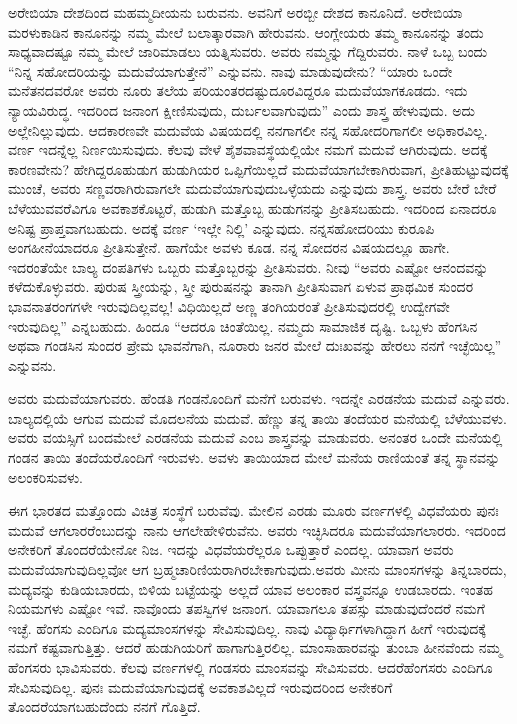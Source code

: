 ಅರೇಬಿಯಾ ದೇಶದಿಂದ ಮಹಮ್ಮದೀಯನು ಬರುವನು. ಅವನಿಗೆ ಅರಬ್ಬೀ ದೇಶದ ಕಾನೂನಿದೆ. ಅರೇಬಿಯಾ ಮರಳುಕಾಡಿನ ಕಾನೂನನ್ನು ನಮ್ಮ ಮೇಲೆ ಬಲಾತ್ಕಾರವಾಗಿ ಹೇರುವನು. ಆಂಗ್ಲೇಯರು ತಮ್ಮ ಕಾನೂನನ್ನು ತಂದು ಸಾಧ್ಯವಾದಷ್ಟೂ ನಮ್ಮ ಮೇಲೆ ಜಾರಿಮಾಡಲು ಯತ್ನಿಸುವರು. ಅವರು ನಮ್ಮನ್ನು ಗೆದ್ದಿರುವರು. ನಾಳೆ ಒಬ್ಬ ಬಂದು “ನಿನ್ನ ಸಹೋದರಿಯನ್ನು ಮದುವೆಯಾಗುತ್ತೇನೆ” ಎನ್ನುವನು. ನಾವು ಮಾಡುವುದೇನು? “ಯಾರು ಒಂದೇ ಮನೆತನದವರೋ ಅವರು ನೂರು ತಲೆಯ ಪರಿಯಂತರದಷ್ಟು\break ದೂರವಿದ್ದರೂ ಮದುವೆಯಾಗಕೂಡದು. ಇದು ನ್ಯಾಯವಿರುದ್ಧ. ಇದರಿಂದ ಜನಾಂಗ ಕ್ಷೀಣಿಸುವುದು, ದುರ್ಬಲವಾಗುವುದು” ಎಂದು ಶಾಸ್ತ್ರ ಹೇಳುವುದು. ಅದು ಅಲ್ಲೇ\break ನಿಲ್ಲುವುದು. ಆದಕಾರಣವೇ ಮದುವೆಯ ವಿಷಯದಲ್ಲಿ ನನಗಾಗಲೀ ನನ್ನ ಸಹೋದರಿಗಾಗಲೀ ಅಧಿಕಾರವಿಲ್ಲ. ವರ್ಣ ಇದನ್ನೆಲ್ಲ ನಿರ್ಣಯಿಸುವುದು. ಕೆಲವು ವೇಳೆ ಶೈಶವಾವಸ್ಥೆಯಲ್ಲಿಯೇ ನಮಗೆ ಮದುವೆ ಆಗಿರುವುದು. ಅದಕ್ಕೆ ಕಾರಣವೇನು? ಹೇಗಿದ್ದರೂ\break ಹುಡುಗ ಹುಡುಗಿಯರ ಒಪ್ಪಿಗೆಯಿಲ್ಲದೆ ಮದುವೆಯಾಗಬೇಕಾಗಿರುವಾಗ, ಪ್ರೀತಿ\break ಹುಟ್ಟುವುದಕ್ಕೆ ಮುಂಚೆ, ಅವರು ಸಣ್ಣವರಾಗಿರುವಾಗಲೇ ಮದುವೆಯಾಗುವುದು\break ಒಳ್ಳೆಯದು ಎನ್ನುವುದು ಶಾಸ್ತ್ರ. ಅವರು ಬೇರೆ ಬೇರೆ ಬೆಳೆಯುವವರೆವಿಗೂ ಅವಕಾಶ\break ಕೊಟ್ಟರೆ, ಹುಡುಗಿ ಮತ್ತೊಬ್ಬ ಹುಡುಗನನ್ನು ಪ್ರೀತಿಸಬಹುದು. ಇದರಿಂದ ಏನಾದರೂ ಅನಿಷ್ಟ ಪ್ರಾಪ್ತವಾಗಬಹುದು. ಅದಕ್ಕೆ ವರ್ಣ ‘ಇಲ್ಲೇ ನಿಲ್ಲಿ’ ಎನ್ನುವುದು. ನನ್ನ\break ಸಹೋದರಿಯು ಕುರೂಪಿ ಅಂಗಹೀನೆಯಾದರೂ ಪ್ರೀತಿಸುತ್ತೇನೆ. ಹಾಗೆಯೇ ಅವಳು ಕೂಡ. ನನ್ನ ಸೋದರನ ವಿಷಯದಲ್ಲೂ ಹಾಗೇ. ಇದರಂತೆಯೇ ಬಾಲ್ಯ ದಂಪತಿಗಳು ಒಬ್ಬರು ಮತ್ತೊಬ್ಬರನ್ನು ಪ್ರೀತಿಸುವರು. ನೀವು “ಅವರು ಎಷ್ಟೋ ಆನಂದವನ್ನು ಕಳೆದುಕೊಳ್ಳುವರು. ಪುರುಷ ಸ್ತ್ರೀಯನ್ನು, ಸ್ತ್ರೀ ಪುರುಷನನ್ನು ತಾನಾಗಿ ಪ್ರೀತಿಸುವಾಗ ಏಳುವ ಪ್ರಾಥಮಿಕ ಸುಂದರ ಭಾವನಾತರಂಗಗಳೇ ಇರುವುದಿಲ್ಲವಲ್ಲ! ವಿಧಿಯಿಲ್ಲದೆ ಅಣ್ಣ ತಂಗಿಯರಂತೆ ಪ್ರೀತಿಸುವುದರಲ್ಲಿ ಉದ್ವೇಗವೇ ಇರುವುದಿಲ್ಲ” ಎನ್ನಬಹುದು. ಹಿಂದೂ “ಆದರೂ ಚಿಂತೆಯಿಲ್ಲ. ನಮ್ಮದು ಸಾಮಾಜಿಕ ದೃಷ್ಟಿ. ಒಬ್ಬಳು ಹೆಂಗಸಿನ ಅಥವಾ ಗಂಡಸಿನ ಸುಂದರ ಪ್ರೇಮ ಭಾವನೆಗಾಗಿ, ನೂರಾರು ಜನರ ಮೇಲೆ ದುಃಖವನ್ನು ಹೇರಲು ನನಗೆ ಇಚ್ಛೆಯಿಲ್ಲ” ಎನ್ನುವನು.

ಅವರು ಮದುವೆಯಾಗುವರು. ಹೆಂಡತಿ ಗಂಡನೊಂದಿಗೆ ಮನೆಗೆ ಬರುವಳು. ಇದನ್ನೇ ಎರಡನೆಯ ಮದುವೆ ಎನ್ನುವರು. ಬಾಲ್ಯದಲ್ಲಿಯೆ ಆಗುವ ಮದುವೆ ಮೊದಲನೆಯ ಮದುವೆ. ಹೆಣ್ಣು ತನ್ನ ತಾಯಿ ತಂದೆಯರ ಮನೆಯಲ್ಲಿ ಬೆಳೆಯುವಳು. ಅವರು ವಯಸ್ಸಿಗೆ ಬಂದಮೇಲೆ ಎರಡನೆಯ ಮದುವೆ ಎಂಬ ಶಾಸ್ತ್ರವನ್ನು ಮಾಡುವರು. ಅನಂತರ ಒಂದೇ ಮನೆಯಲ್ಲಿ ಗಂಡನ ತಾಯಿ ತಂದೆಯರೊಂದಿಗೆ ಇರುವಳು. ಅವಳು ತಾಯಿಯಾದ ಮೇಲೆ ಮನೆಯ ರಾಣಿಯಂತೆ ತನ್ನ ಸ್ಥಾನವನ್ನು ಅಲಂಕರಿಸುವಳು.

ಈಗ ಭಾರತದ ಮತ್ತೊಂದು ವಿಚಿತ್ರ ಸಂಸ್ಥೆಗೆ ಬರುವೆವು. ಮೇಲಿನ ಎರಡು ಮೂರು ವರ್ಣಗಳಲ್ಲಿ ವಿಧವೆಯರು ಪುನಃ ಮದುವೆ ಆಗಲಾರರೆಂಬುದನ್ನು ನಾನು ಆಗಲೇ\break ಹೇಳಿರುವೆನು. ಅವರು ಇಚ್ಛಿಸಿದರೂ ಮದುವೆಯಾಗಲಾರರು. ಇದರಿಂದ ಅನೇಕರಿಗೆ ತೊಂದರೆಯೇನೋ ನಿಜ. ಇದನ್ನು ವಿಧವೆಯರೆಲ್ಲರೂ ಒಪ್ಪುತ್ತಾರೆ ಎಂದಲ್ಲ. ಯಾವಾಗ ಅವರು ಮದುವೆಯಾಗುವುದಿಲ್ಲವೋ ಆಗ ಬ್ರಹ್ಮಚಾರಿಣಿಯರಾಗಿರಬೇಕಾಗುವುದು.\break ಅವರು ಮೀನು ಮಾಂಸಗಳನ್ನು ತಿನ್ನಬಾರದು, ಮದ್ಯವನ್ನು ಕುಡಿಯಬಾರದು, ಬಿಳಿಯ ಬಟ್ಟೆಯನ್ನು ಅಲ್ಲದೆ ಯಾವ ಅಲಂಕಾರ ವಸ್ತ್ರವನ್ನೂ ಉಡಬಾರದು. ಇಂತಹ ನಿಯಮಗಳು ಎಷ್ಟೋ ಇವೆ. ನಾವೊಂದು ತಪಸ್ವಿಗಳ ಜನಾಂಗ. ಯಾವಾಗಲೂ ತಪಸ್ಸು ಮಾಡುವುದೆಂದರೆ ನಮಗೆ ಇಚ್ಛೆ. ಹೆಂಗಸು ಎಂದಿಗೂ ಮದ್ಯಮಾಂಸಗಳನ್ನು ಸೇವಿಸುವುದಿಲ್ಲ. ನಾವು ವಿದ್ಯಾರ್ಥಿಗಳಾಗಿದ್ದಾಗ ಹೀಗೆ ಇರುವುದಕ್ಕೆ ನಮಗೆ ಕಷ್ಟವಾಗುತ್ತಿತ್ತು. ಆದರೆ ಹುಡುಗಿಯರಿಗೆ ಹಾಗಾಗುತ್ತಿರಲಿಲ್ಲ. ಮಾಂಸಾಹಾರವನ್ನು ತುಂಬಾ ಹೀನವೆಂದು ನಮ್ಮ ಹೆಂಗಸರು ಭಾವಿಸುವರು. ಕೆಲವು ವರ್ಣಗಳಲ್ಲಿ ಗಂಡಸರು ಮಾಂಸವನ್ನು ಸೇವಿಸುವರು. ಆದರೆ\break ಹೆಂಗಸರು ಎಂದಿಗೂ ಸೇವಿಸುವುದಿಲ್ಲ. ಪುನಃ ಮದುವೆಯಾಗುವುದಕ್ಕೆ ಅವಕಾಶವಿಲ್ಲದೆ ಇರುವುದರಿಂದ ಅನೇಕರಿಗೆ ತೊಂದರೆಯಾಗಬಹುದೆಂದು ನನಗೆ ಗೊತ್ತಿದೆ.

